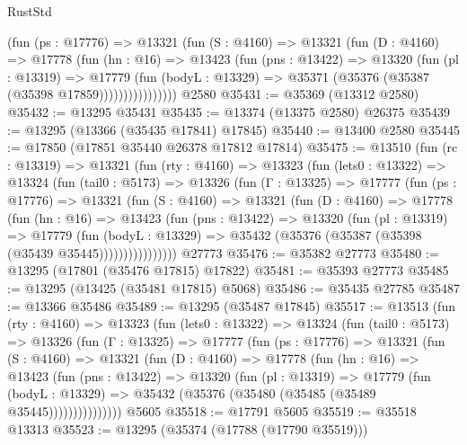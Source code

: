 \begin{lexlean}{RustStd}
\begin{coremodule}
                (fun (ps : @17776) =>
                @13321
                  (fun (S : @4160) =>
                  @13321
                    (fun (D : @4160) =>
                    @17778
                      (fun (hn : @16) =>
                      @13423
                        (fun (pns : @13422) =>
                        @13320
                          (fun (pl : @13319) =>
                          @17779
                            (fun (bodyL : @13329) =>
                            @35371 (@35376 (@35387 (@35398 @17859))))))))))))))))
    @2580
@35431 := @35369 (@13312 @2580)
@35432 := @13295 @35431
@35435 := @13374 (@13375 @2580) @26375
@35439 := @13295 (@13366 (@35435 @17841) @17845)
@35440 := @13400 @2580
@35445 := @17850 (@17851 @35440 @26378 @17812 @17814)
@35475 := @13510
    (fun (rc : @13319) =>
    @13321
      (fun (rty : @4160) =>
      @13323
        (fun (lets0 : @13322) =>
        @13324
          (fun (tail0 : @5173) =>
          @13326
            (fun (Γ : @13325) =>
            @17777
              (fun (ps : @17776) =>
              @13321
                (fun (S : @4160) =>
                @13321
                  (fun (D : @4160) =>
                  @17778
                    (fun (hn : @16) =>
                    @13423
                      (fun (pns : @13422) =>
                      @13320
                        (fun (pl : @13319) =>
                        @17779
                          (fun (bodyL : @13329) =>
                          @35432 (@35376 (@35387 (@35398 (@35439 @35445))))))))))))))))
    @27773
@35476 := @35382 @27773
@35480 := @13295 (@17801 (@35476 @17815) @17822)
@35481 := @35393 @27773
@35485 := @13295 (@13425 (@35481 @17815) @5068)
@35486 := @35435 @27785
@35487 := @13366 @35486
@35489 := @13295 (@35487 @17845)
@35517 := @13513
    (fun (rty : @4160) =>
    @13323
      (fun (lets0 : @13322) =>
      @13324
        (fun (tail0 : @5173) =>
        @13326
          (fun (Γ : @13325) =>
          @17777
            (fun (ps : @17776) =>
            @13321
              (fun (S : @4160) =>
              @13321
                (fun (D : @4160) =>
                @17778
                  (fun (hn : @16) =>
                  @13423
                    (fun (pns : @13422) =>
                    @13320
                      (fun (pl : @13319) =>
                      @17779
                        (fun (bodyL : @13329) =>
                        @35432 (@35376 (@35480 (@35485 (@35489 @35445)))))))))))))))
    @5605
@35518 := @17791 @5605
@35519 := @35518 @13313
@35523 := @13295 (@35374 (@17788 (@17790 @35519)))

\end{coremodule}
\end{lexlean}

